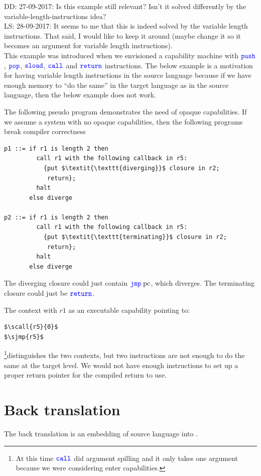 \documentclass[a3paper]{article}
\newcommand\lau[1]{{\color{purple} \sf \footnotesize {LS: #1}}\\}
\newcommand\dominique[1]{{\color{purple} \sf \footnotesize {DD: #1}}\\}
\newcommand{\sourcecolor}{\color{blue}}
\newcommand{\src}[1]{{\sourcecolor #1}}
\newcommand{\zinstr}[1]{\texttt{#1}}
\newcommand{\oneinstr}[2]{
  \ifthenelse{\equal{#2}{}}
  {\zinstr{#1}}
  {\zinstr{#1} \; #2}
}
\newcommand{\twoinstr}[3]{
  \ifthenelse{\equal{#2#3}{}}
  {\zinstr{#1}}
  {\zinstr{#1} \; #2 \; #3}
}
\newcommand{\sreturn}{\zinstr{\src{return}}}
\newcommand{\sjmp}[1]{\oneinstr{\src{jmp}}{#1}}
\newcommand{\spush}[1]{\oneinstr{\src{push}}{#1}}
\newcommand{\spop}[1]{\oneinstr{\src{pop}}{#1}}
\newcommand{\ssload}[2]{\twoinstr{\src{sload}}{#1}{#2}}
\newcommand{\scall}[3][]{  
\ifthenelse{\equal{#2#3}{}}
  {\ensuremath{\zinstr{\src{call}}_{#1}}}
  {\ensuremath{\zinstr{\src{call}}_{#1} \; #2 \; #3}}
}
\newcommand{\pcreg}{\mathrm{pc}}
\begin{document}
\dominique{27-09-2017: Is this example still relevant? Isn't it solved differently by the variable-length-instructions idea?}
\lau{28-09-2017: It seems to me that this is indeed solved by the variable length instructions. That said, I would like to keep it around (maybe change it so it becomes an argument for variable length instructions).}
This example was introduced when we envisioned a capability machine with $\spush{}$, $\spop{}$, $\ssload{}{}$, $\scall{}{}$ and $\sreturn$ instructions. The below example is a motivation for having variable length instructions in the source language because if we have enough memory to ``do the same'' in the target language as in the source language, then the below example does not work.

The following pseudo program demonstrates the need of opaque capabilities. If we assume a system with no opaque capabilities, then the following programs break compiler correctness
\begin{lstlisting}[basicstyle=\sourcecolor{}\ttfamily] 
p1 ::= if r1 is length 2 then
         call r1 with the following callback in r5:
           {put $\textit{\texttt{diverging}}$ closure in r2;
            return};
         halt
       else diverge

p2 ::= if r1 is length 2 then
         call r1 with the following callback in r5:
           {put $\textit{\texttt{terminating}}$ closure in r2;
            return};
         halt
       else diverge
\end{lstlisting}
The diverging closure could just contain $\sjmp{\pcreg}$, which diverges. The terminating closure could just be $\sreturn$.

The context with $r1$ as an executable capability pointing to:
\begin{lstlisting}[basicstyle=\sourcecolor{}\ttfamily] 
$\scall{r5}{0}$
$\sjmp{r5}$
\end{lstlisting}
\footnote{At this time $\scall{}{}$ did argument spilling and it only takes one argument because we were considering enter capabilities.}distinguishes the two contexts, but two instructions are not enough to do the same at the target level. We would not have enough instructions to set up a proper return pointer for the compiled return to use.

\clearpage
\section{Back translation}
The back translation is an embedding of source language into .
\end{document}
